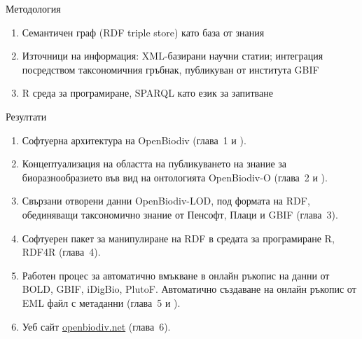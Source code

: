 \documentclass[bulgarian]{beamer}
\begin{document}
\begin{frame}{Методология}

\begin{enumerate}
\item {Семантичен граф (RDF triple store) като база от знания}
\item{Източници на информация: XML-базирани научни статии; интеграция посредством таксономичния гръбнак, публикуван от института GBIF}
\item{R среда за програмиране, SPARQL като език за запитване}

\end{enumerate}

\end{frame}

\begin{frame}{Резултати}

\begin{enumerate}
    \item Софтуерна архитектура на OpenBiodiv (глава~1 и \cite{senderov_open_2016}).
    \item Концептуализация на областта на публикуването на знание за биоразнообразието във вид на онтологията OpenBiodiv-O (глава~2 и \cite{senderov_openbiodiv-o:_2018}). 
    \item Свързани отворени данни OpenBiodiv-LOD, под формата на RDF, обединяващи таксономично знание от Пенсофт, Плаци и GBIF (глава~3).
    \item Софтуерен пакет за манипулиране на RDF в средата за програмиране R, RDF4R (глава~4).
    \item Работен процес за автоматично вмъкване в онлайн ръкопис на данни от BOLD, GBIF, iDigBio, PlutoF. Автоматично създаване на онлайн ръкопис от EML файл с метаданни (глава~5 и \cite{senderov_online_2016}).
    \item Уеб сайт \href{http://openbiodiv.net}{openbiodiv.net} (глава~6).

\end{enumerate}
    
\end{frame}
\end{document}
